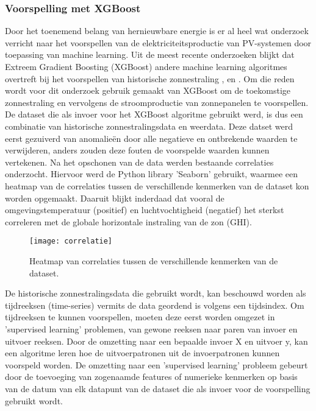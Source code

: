 \subsubsection{Voorspelling met XGBoost}

Door het toenemend belang van hernieuwbare energie is er al heel wat onderzoek verricht naar het voorspellen van de elektriciteitsproductie van PV-systemen door toepassing van machine learning. Uit de meest recente onderzoeken blijkt dat Extreem Gradient Boosting (XGBoost) andere machine learning algoritmes overtreft bij het voorspellen van historische zonnestraling  \autocite{Ledmaoui2023}, \autocite{Wang2022} en \autocite{BarreraAnimas2022}. Om die reden wordt voor dit onderzoek gebruik gemaakt van XGBoost om de toekomstige zonnestraling en vervolgens de stroomproductie van zonnepanelen te voorspellen. \\

De dataset die als invoer voor het XGBoost algoritme gebruikt werd, is dus een combinatie van historische zonnestralingsdata en weerdata. Deze datset werd eerst gezuiverd van anomalieën door alle negatieve en ontbrekende waarden te verwijderen, anders zouden deze fouten de voorspelde waarden kunnen vertekenen. Na het opschonen van de data werden bestaande correlaties onderzocht. Hiervoor werd de Python library 'Seaborn' gebruikt, waarmee een heatmap van de correlaties tussen de verschillende kenmerken van de dataset kon worden opgemaakt. Daaruit blijkt inderdaad dat vooral de omgevingstemperatuur (positief) en luchtvochtigheid (negatief) het sterkst correleren met de globale horizontale instraling van de zon (GHI). 

\begin{figure}[h!]
    \centering\texttt{[image: correlatie]}
    \caption{\label{fig:correlatie}Heatmap van correlaties tussen de verschillende kenmerken van de dataset.}
\end{figure} 

\newpage
De historische zonnestralingsdata die gebruikt wordt, kan beschouwd worden als tijdreeksen (time-series) vermits de data geordend is volgens een tijdsindex. Om tijdreeksen te kunnen voorspellen, moeten deze eerst worden omgezet in 'supervised learning' problemen, van gewone reeksen naar paren van invoer en uitvoer reeksen. Door de omzetting naar een bepaalde invoer X en uitvoer y, kan een algoritme leren hoe de uitvoerpatronen uit de invoerpatronen kunnen voorspeld worden. De omzetting naar een  'supervised learning' probleem gebeurt door de toevoeging van zogenaamde features of numerieke kenmerken op basis van de datum van elk datapunt van de dataset die als invoer voor de voorspelling gebruikt wordt. \\

